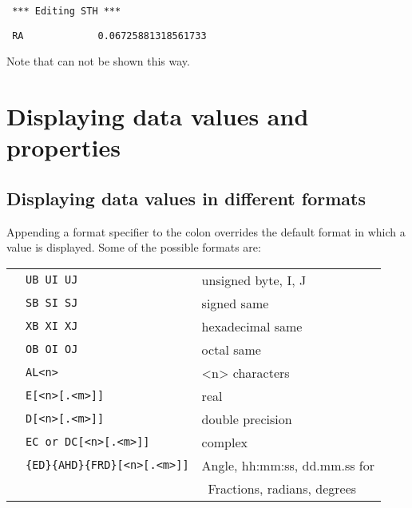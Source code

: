 \spbegin %
\svbegin \begin{verbatim} 
 *** Editing STH *** 
\end{verbatim}\svend 
%
%
\svbegin \begin{verbatim} 
 RA             0.06725881318561733
\end{verbatim} 
\svend 
\spend %

\noindent Note that  can not be shown this
way. 

\section{ Displaying data values and properties} 

\subsection{ Displaying data values in different formats } 
\label{.show.in.format} 

	Appending a format specifier to the colon overrides the default format
in which a value is displayed.  Some of the possible formats are: 

\begin{tabular}{lll} 

	&\verb/UB UI UJ/                        &unsigned byte, I, J \\ 
	&\verb/SB SI SJ/                        &signed same \\ 
	&\verb/XB XI XJ/                        &hexadecimal same \\ 
	&\verb/OB OI OJ/                        &octal same \\ 
	&\verb/AL<n>/                           &<n> characters \\ 
	&\verb/E[<n>[.<m>]]/                    &real \\ 
	&\verb/D[<n>[.<m>]]/                    &double precision \\ 
	&\verb/EC or DC[<n>[.<m>]]/             &complex \\ 
	&\verb/{ED}{AHD}{FRD}[<n>[.<m>]]/       &Angle, hh:mm:ss, dd.mm.ss
for\\ 
	&                                       &\ Fractions, radians,
degrees\\ 
\end{tabular} 

